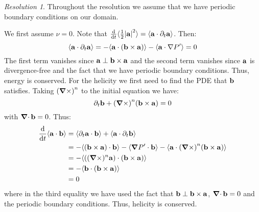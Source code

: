 \documentclass[10pt,a4paper]{article}
\theoremstyle{definition}
\theoremstyle{remark}
\newtheorem*{res}{Resolution}
\begin{document}
\begin{res}
  Throughout the resolution we assume that we have periodic boundary conditions on our domain.

  We first assume $\nu=0$. Note that $\dv{}{t}\langle \frac{1}{2} \abs{\boldsymbol{\mathrm{a}}}^2\rangle = \langle \boldsymbol{\mathrm{a}}\cdot\partial_t\boldsymbol{\mathrm{a}}\rangle$. Then:
  \begin{equation*}
    \langle\boldsymbol{\mathrm{a}}\cdot \partial_t\boldsymbol{\mathrm{a}}\rangle = -\langle \boldsymbol{\mathrm{a}}\cdot(\boldsymbol{\mathrm{b}}\times\boldsymbol{\mathrm{a}})\rangle - \langle \boldsymbol{\mathrm{a}}\cdot\nabla P'\rangle =0
  \end{equation*}
  The first term vanishes since $\boldsymbol{\mathrm{a}}\perp\boldsymbol{\mathrm{b}}\times\boldsymbol{\mathrm{a}}$ and the second term vanishes since $\boldsymbol{\mathrm{a}}$ is divergence-free and the fact that we have periodic boundary conditions. Thus, energy is conserved. For the helicity we first need to find the PDE that $\boldsymbol{\mathrm{b}}$ satisfies. Taking ${(\operatorname{\boldsymbol{\mathrm{\nabla}}\times})}^n$ to the initial equation we have:
  \begin{equation*}
    \partial_t\boldsymbol{\mathrm{b}} + {(\operatorname{\boldsymbol{\mathrm{\nabla}}\times})}^n(\boldsymbol{\mathrm{b}}\times\boldsymbol{\mathrm{a}}) = 0
  \end{equation*}
  with $\operatorname{\boldsymbol{\mathrm{\nabla}}\cdot}\boldsymbol{\mathrm{b}}=0$.
  Thus:
  \begin{align*}
    \dv{}{t}\langle \boldsymbol{\mathrm{a}}\cdot\boldsymbol{\mathrm{b}}\rangle & = \langle \partial_t\boldsymbol{\mathrm{a}}\cdot\boldsymbol{\mathrm{b}}\rangle + \langle \boldsymbol{\mathrm{a}}\cdot\partial_t\boldsymbol{\mathrm{b}}\rangle                                                           \\
                                             & = -\langle (\boldsymbol{\mathrm{b}}\times\boldsymbol{\mathrm{a}})\cdot\boldsymbol{\mathrm{b}}\rangle - \langle \grad P'\cdot\boldsymbol{\mathrm{b}}\rangle - \langle \boldsymbol{\mathrm{a}}\cdot {(\operatorname{\boldsymbol{\mathrm{\nabla}}\times})}^n(\boldsymbol{\mathrm{b}}\times\boldsymbol{\mathrm{a}})\rangle \\
                                             & = -\langle (({\operatorname{\boldsymbol{\mathrm{\nabla}}\times}})^n\boldsymbol{\mathrm{a}})\cdot (\boldsymbol{\mathrm{b}}\times \boldsymbol{\mathrm{a}})\rangle                                                                                    \\
                                             & = -\langle \boldsymbol{\mathrm{b}}\cdot (\boldsymbol{\mathrm{b}}\times \boldsymbol{\mathrm{a}})\rangle                                                                                                 \\
                                             & =0
  \end{align*}
  where in the third equality we have used the fact that $\boldsymbol{\mathrm{b}}\perp \boldsymbol{\mathrm{b}}\times\boldsymbol{\mathrm{a}}$, $\operatorname{\boldsymbol{\mathrm{\nabla}}\cdot} \boldsymbol{\mathrm{b}}=0$ and the periodic boundary conditions. Thus, helicity is conserved.


\end{res}
\end{document}
